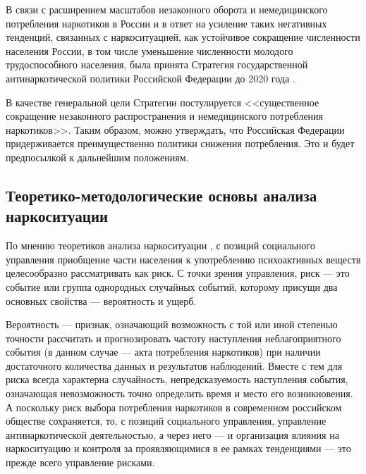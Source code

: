 \documentclass[a4paper,14pt]{article}
\begin{document}
В связи с расширением масштабов незаконного оборота и немедицинского потребления 
наркотиков  в России и в ответ на усиление таких негативных тенденций, связанных 
с наркоситуацией, как устойчивое сокращение численности населения России, в том 
числе уменьшение численности молодого трудоспособного населения, была принята 
Стратегия государственной антинаркотической политики
Российской Федерации до 2020 года \cite{ru_nat_drug_strat}. 

В качестве генеральной цели Стратегии постулируется <<существенное сокращение 
незаконного распространения и немедицинского потребления наркотиков>>. Таким 
образом, можно утверждать, что Российская Федерации придерживается 
преимущественно политики снижения потребления. Это и будет предпосылкой к 
дальнейшим положениям.

\subsection{Теоретико-методологические основы анализа наркоситуации}

По мнению теоретиков анализа наркоситуации \cite{Karpets2010}, с позиций
социального управления приобщение части населения к употреблению психоактивных
веществ целесообразно рассматривать как риск. С точки зрения управления, риск
–-- это событие или группа однородных случайных событий, которому присущи два
основных свойства --– вероятность и ущерб.

Вероятность –-- признак, означающий возможность с той или иной степенью точности
рассчитать и прогнозировать частоту наступления неблагоприятного события (в
данном случае --– акта потребления наркотиков) при наличии достаточного
количества данных и результатов наблюдений. Вместе с тем для риска всегда
характерна случайность, непредсказуемость наступления события, означающая
невозможность точно определить время и место его возникновения. А поскольку риск
выбора потребления наркотиков в современном российском обществе сохраняется, то,
с позиций социального управления, управление антинаркотической деятельностью, а
через него –-- и организация влияния на наркоситуацию и контроля за
проявляющимися в ее рамках тенденциями –-- это прежде всего управление рисками.
\end{document}
